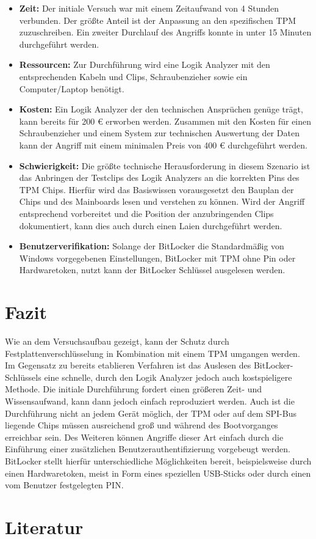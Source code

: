 \documentclass[conference]{IEEEtran}
\begin{document}
\begin{itemize}
	
	\item {\bf Zeit:} Der initiale Versuch war mit einem Zeitaufwand von 4 Stunden verbunden. Der größte Anteil ist der Anpassung an den spezifischen TPM zuzuschreiben. Ein zweiter Durchlauf des Angriffs konnte in unter 15 Minuten durchgeführt werden. 
	\item {\bf Ressourcen:} Zur Durchführung wird eine Logik Analyzer mit den entsprechenden Kabeln und Clips, Schraubenzieher sowie ein Computer/Laptop benötigt. 
	\item {\bf Kosten:} Ein Logik Analyzer der den technischen Ansprüchen genüge trägt, kann bereits für 200 € erworben werden. Zusammen mit den Kosten für einen Schraubenzieher und einem System zur technischen Auswertung der Daten kann der Angriff mit einem minimalen Preis von 400 € durchgeführt werden. 
	\item {\bf Schwierigkeit:} Die größte technische Herausforderung in diesem Szenario ist das Anbringen der Testclips des Logik Analyzers an die korrekten Pins des TPM Chips. Hierfür wird das Basiswissen vorausgesetzt den Bauplan der Chips und des Mainboards lesen und verstehen zu können. Wird der Angriff entsprechend vorbereitet und die Position der anzubringenden Clips dokumentiert, kann dies auch durch einen Laien durchgeführt werden.
	\item {\bf Benutzerverifikation:} Solange der BitLocker die Standardmäßig von Windows vorgegebenen Einstellungen, BitLocker mit TPM ohne Pin oder Hardwaretoken, nutzt kann der BitLocker Schlüssel ausgelesen werden.
	
\end{itemize}

\section{Fazit}
Wie an dem Versuchsaufbau gezeigt, kann der Schutz durch Festplattenverschlüsselung in Kombination mit einem TPM umgangen werden. Im Gegensatz zu bereits etablieren Verfahren ist das Auslesen des BitLocker-Schlüssels eine schnelle, durch den Logik Analyzer jedoch auch kostspieligere Methode. Die initiale Durchführung fordert einen größeren Zeit- und Wissensaufwand, kann dann jedoch einfach reproduziert werden. Auch ist die Durchführung nicht an jedem Gerät möglich, der TPM oder auf dem SPI-Bus liegende Chips müssen ausreichend groß und während des Bootvorganges erreichbar sein. Des Weiteren können Angriffe dieser Art einfach durch die Einführung einer zusätzlichen Benutzerauthentifizierung vorgebeugt werden. BitLocker stellt hierfür unterschiedliche Möglichkeiten bereit, beispielsweise durch einen Hardwaretoken, meist in Form eines speziellen USB-Sticks oder durch einen vom Benutzer festgelegten PIN. 

\section{Literatur}
\printbibliography[heading=none]
\end{document}
